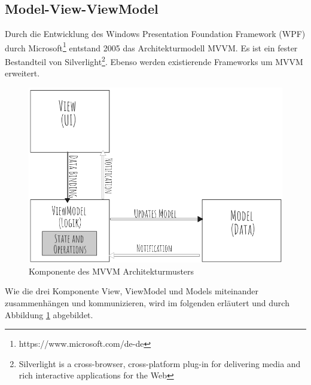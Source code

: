 \subsection{Model-View-ViewModel}
Durch die Entwicklung des Windows Presentation Foundation Framework (WPF) durch Microsoft\footnote{https://www.microsoft.com/de-de} entstand 2005 das Architekturmodell \ac{MVVM}. Es ist ein fester Bestandteil von Silverlight\footnote{Silverlight is a cross-browser, cross-platform plug-in for delivering media and rich interactive applications for the Web}. Ebenso werden existierende Frameworks um \ac{MVVM} erweitert\cite{Jaeckle2015}.

\begin{figure}[H] 
\centering
\includegraphics[scale=0.45]{fig/mvvmv2.png} 
\caption{Komponente des MVVM Architekturmusters\footnotemark}
\label{fig:MVVM}
\end{figure} 
Wie die drei Komponente View, ViewModel und Models miteinander zusammenh\"angen und kommunizieren, wird im folgenden erl\"autert und durch Abbildung \ref{fig:MVVM} abgebildet.

